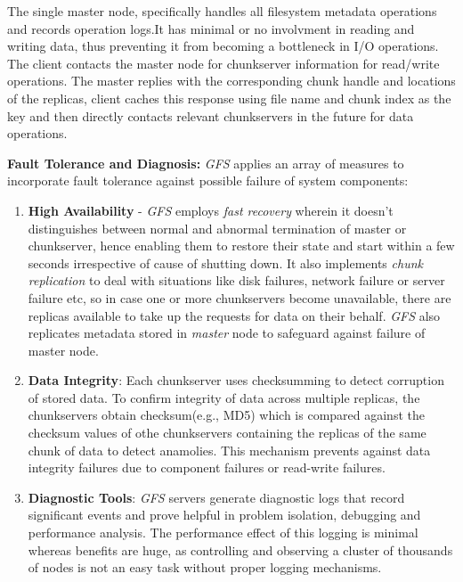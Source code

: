 \documentclass[12pt, a4paper]{article}
\begin{document}
The single master node, specifically handles all filesystem metadata operations and records operation logs.It has minimal or no involvment in reading and writing data, thus preventing it from becoming a bottleneck in I/O operations. The client contacts the master node for chunkserver information for read/write operations. The master replies with the corresponding chunk handle and locations of the replicas, client caches this response using file name and chunk index as the key and then directly contacts relevant chunkservers in the future for data operations.\par

\textbf{Fault Tolerance and Diagnosis:} \textit{GFS}\cite{Ghemawat:2003:GFS:945445.945450} applies an array of measures to incorporate fault tolerance against possible failure of system components:

\begin{enumerate}
        \item \textbf{High Availability} - \textit{GFS}\cite{Ghemawat:2003:GFS:945445.945450} employs \textit{fast recovery} wherein it doesn't distinguishes between normal and abnormal termination of master or chunkserver, hence enabling them to restore their state and start within a few seconds irrespective of cause of shutting down. It also implements \textit{chunk replication} to deal with situations like disk failures, network failure or server failure etc, so in case one or more chunkservers become unavailable, there are replicas available to take up the requests for data on their behalf. \textit{GFS}\cite{Ghemawat:2003:GFS:945445.945450} also replicates metadata stored in \textit{master} node to safeguard against failure of master node.

        \item \textbf{Data Integrity}: Each chunkserver uses checksumming to detect corruption of stored data. To confirm integrity of data across multiple replicas, the chunkservers obtain checksum(e.g., MD5) which is compared against the checksum values of othe chunkservers containing the replicas of the same chunk of data to detect anamolies. This mechanism prevents against data integrity failures due to component failures or read-write failures.

        \item \textbf{Diagnostic Tools}: \textit{GFS}\cite{Ghemawat:2003:GFS:945445.945450} servers generate diagnostic logs that record significant events and prove helpful in problem isolation, debugging and performance analysis. The performance effect of this logging is minimal whereas benefits are huge, as controlling and observing a cluster of thousands of nodes is not an easy task without proper logging mechanisms.
\end{enumerate}

 

\end{document}
